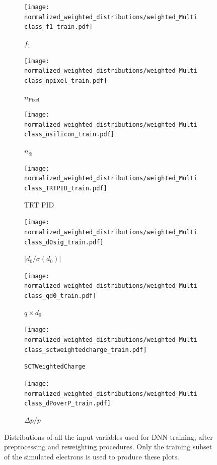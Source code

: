 \begin{figure}[htbp]\ContinuedFloat
  \centering

  \begin{subfigure}[b]{0.47\textwidth}
    \centering
    \texttt{[image: normalized\_weighted\_distributions/weighted\_Multiclass\_f1\_train.pdf]}
    \caption{$f_1$}
    \label{fig:input9}
  \end{subfigure}\hfill
  \begin{subfigure}[b]{0.47\textwidth}
    \centering
    \texttt{[image: normalized\_weighted\_distributions/weighted\_Multiclass\_npixel\_train.pdf]}
    \caption{$n_{\text{Pixel}}$}
    \label{fig:input11}
  \end{subfigure}

  \vspace{0.45cm}

  \begin{subfigure}[b]{0.47\textwidth}
    \centering
    \texttt{[image: normalized\_weighted\_distributions/weighted\_Multiclass\_nsilicon\_train.pdf]}
    \caption{$n_{\text{Si}}$}
    \label{fig:input12}
  \end{subfigure}\hfill
  \begin{subfigure}[b]{0.47\textwidth}
    \centering
    \texttt{[image: normalized\_weighted\_distributions/weighted\_Multiclass\_TRTPID\_train.pdf]}
    \caption{TRT PID}
    \label{fig:input18}
  \end{subfigure}

  \vspace{0.45cm}

  \begin{subfigure}[b]{0.47\textwidth}
    \centering
    \texttt{[image: normalized\_weighted\_distributions/weighted\_Multiclass\_d0sig\_train.pdf]}
    \caption{$|d_0/\sigma(d_0)|$}
    \label{fig:input16}
  \end{subfigure}\hfill
  \begin{subfigure}[b]{0.47\textwidth}
    \centering
    \texttt{[image: normalized\_weighted\_distributions/weighted\_Multiclass\_qd0\_train.pdf]}
    \caption{$q \times d_0$}
    \label{fig:input14}
  \end{subfigure}

  \vspace{0.45cm}

  \begin{subfigure}[b]{0.47\textwidth}
    \centering
    \texttt{[image: normalized\_weighted\_distributions/weighted\_Multiclass\_sctweightedcharge\_train.pdf]}
    \caption{\texttt{SCTWeightedCharge}}
    \label{fig:input15}
  \end{subfigure}\hfill
  \begin{subfigure}[b]{0.47\textwidth}
    \centering
    \texttt{[image: normalized\_weighted\_distributions/weighted\_Multiclass\_dPoverP\_train.pdf]}
    \caption{$\Delta p/p$}
    \label{fig:input17}
  \end{subfigure}
  \caption{Distributions of all the input variables used for DNN training, after preprocessing and reweighting procedures. Only the training subset of the simulated electrons is used to produce these plots.}


\end{figure}
